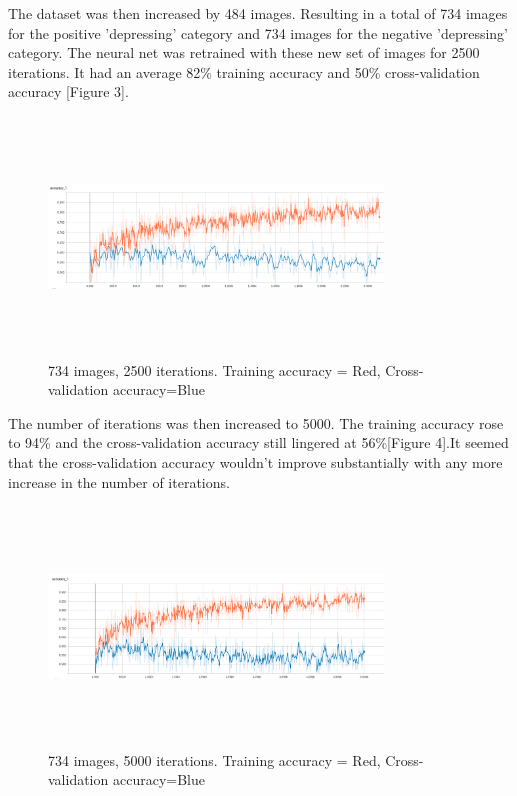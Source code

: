\documentclass[letterpaper]{article}
\begin{document}
The dataset was then increased by 484 images. Resulting in a total of 734 images for the positive 'depressing' category and 734 images for the negative  'depressing' category. The neural net was retrained with these new set of images for 2500 iterations. It had an average 82\% training accuracy and 50\% cross-validation accuracy [Figure 3]. 

\begin{figure}[!htb]
	\begin{center}
		\includegraphics[width=3.5in, height=2.5in]{734_img_2500_it_accuracy.png}
		\caption{734 images, 2500 iterations. Training accuracy = Red, Cross-validation accuracy=Blue}
		\label{fig3}
	\end{center}
\end{figure}

\newpage
The number of iterations was then increased to 5000. The training accuracy rose to 94\% and the cross-validation accuracy still lingered at 56\%[Figure 4].It seemed that the cross-validation accuracy wouldn't improve substantially with any more increase in the number of iterations. 

\begin{figure}[!htb]
	\begin{center}
		\includegraphics[width=3.5in, height=2.5in]{734_img_5000_it_accuracy.png}
		\caption{734 images, 5000 iterations. Training accuracy = Red, Cross-validation accuracy=Blue}
		\label{fig1}
	\end{center}
\end{figure}
\end{document}
